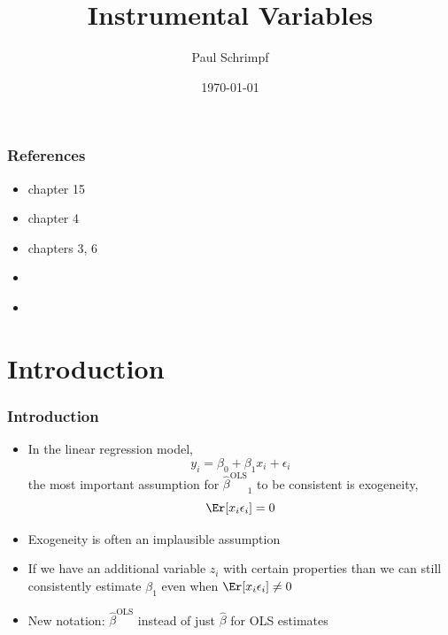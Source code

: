 %

\title{Instrumental Variables}
\author{Paul Schrimpf}
\date{\today}


\providecommand{\bols}{{\hat{\beta}^{\mathrm{OLS}}}}
\providecommand{\biv}{{\hat{\beta}^{\mathrm{IV}}}}
\providecommand{\btsls}{{\hat{\beta}^{\mathrm{2SLS}}}}

\graphicspath{{figures/}}



\frame{\titlepage}

\begin{frame}
  \tableofcontents  
\end{frame}

\begin{frame}
  \frametitle{References}
  \begin{itemize}
  \item \cite{w2013} chapter 15
  \item \cite{ap2009} chapter 4
  \item \cite{ap2014} chapters 3, 6
  \item \cite{ak2001}
  \item \cite{murray2006}
  \end{itemize}
\end{frame}


\section{Introduction}

\begin{frame}[allowframebreaks]\frametitle{Introduction}
  \begin{itemize}
  \item In the linear regression model,
    \[ y_i = \beta_0 + \beta_1 x_i + \epsilon_i \]
    the most important assumption for $\bols_1$ to be consistent is
    exogeneity, 
    \[ \Er[ x_i \epsilon_i ] = 0 \] 
  \item Exogeneity is often an implausible assumption
  \item If we have an additional variable $z_i$ with certain
    properties than we can still consistently estimate $\beta_1$ even
    when $\Er[x_i \epsilon_i] \neq 0$
  \item New notation: $\bols$ instead of just $\hat{\beta}$ for OLS
    estimates 
  \end{itemize}
\end{frame}

